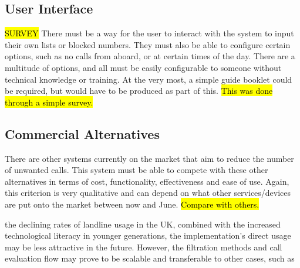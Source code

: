 \documentclass[main.tex]{subfiles}
\begin{document}
\subsection{User Interface}
\hl{SURVEY}
There must be a way for the user to interact with the system to input their own lists or blocked numbers. They must also be able to configure certain options, such as no calls from aboard, or at certain times of the day. There are a multitude of options, and all must be easily configurable to someone without technical knowledge or training. At the very most, a simple guide booklet could be required, but would have to be produced as part of this. \hl{This was done through a simple survey.}

\subsection{Commercial Alternatives}
There are other systems currently on the market that aim to reduce the number of unwanted calls. This system must be able to compete with these other alternatives in terms of cost, functionality, effectiveness and ease of use. Again, this criterion is very qualitative and can depend on what other services/devices are put onto the market between now and June. \hl{Compare with others.}



the declining rates of landline usage in the UK, combined with the increased technological literacy in younger generations, the implementation’s direct usage may be less attractive in the future. However, the filtration methods and call evaluation flow may prove to be scalable and transferable to other cases, such as
\end{document}
